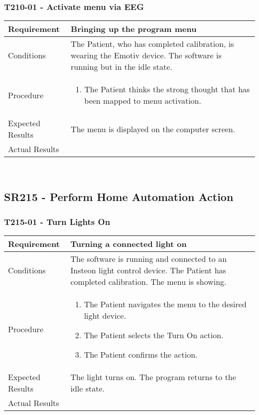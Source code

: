 \documentclass{article}
\begin{document}
\subsubsection{T210-01 - Activate menu via EEG}
\begin{tabular}{| l | p{12cm} |}
    \hline
	Requirement & Bringing up the program menu \\ \hline
	Conditions & The Patient, who has completed calibration, is wearing the
	Emotiv device. The software is running but in the idle state. \\ \hline
	Procedure &
\begin{enumerate}
	\item The Patient thinks the strong thought that has been mapped to menu
	    activation.
\end{enumerate} \\ \hline
	Expected Results & The menu is displayed on the computer screen. \\ \hline
	Actual Results & \vspace{1cm} \\ \hline
\end{tabular}

\hfill \\

\subsection{SR215 - Perform Home Automation Action}
\subsubsection{T215-01 - Turn Lights On}
\begin{tabular}{| l | p{12cm} |}
    \hline
	Requirement & Turning a connected light on \\ \hline
	Conditions & The software is running and connected to an Insteon light
	control device. The Patient has completed calibration. The menu is
	showing. \\
	\hline
	Procedure &
\begin{enumerate}
	\item The Patient navigates the menu to the desired light device.
	\item The Patient selects the Turn On action.
	\item The Patient confirms the action.
\end{enumerate} \\ \hline
	Expected Results & The light turns on. The program returns to the idle state. \\ \hline
	Actual Results & \vspace{1cm} \\ \hline
\end{tabular}
\end{document}
